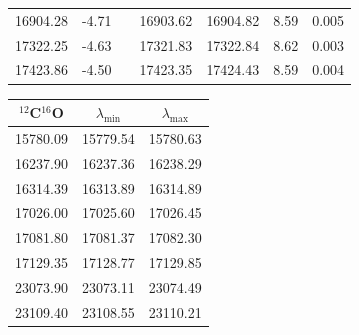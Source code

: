 \begin{table}[h!]
\begin{center}
\begin{tabular}{ccccccc}
16904.28 & -4.71& & 16903.62&16904.82& 8.59&0.005\\
17322.25 & -4.63& & 17321.83&17322.84& 8.62&0.003\\
17423.86 & -4.50& & 17423.35&17424.43& 8.59&0.004\\
        \hline
        \end{tabular} \par
        \vspace{1cm}
        \begin{tabular}{ccc}
          \hline
          \hline
          $^{12}$C$^{16}$O & $\lambda_{\mathrm{min}}$ & $\lambda_{\mathrm{max}}$ \\
          \hline
          15780.09 & 15779.54 & 15780.63 \\
          16237.90 & 16237.36 & 16238.29 \\
          16314.39 & 16313.89 & 16314.89 \\
          17026.00 & 17025.60 & 17026.45 \\
          17081.80 & 17081.37 & 17082.30 \\
          17129.35 & 17128.77 & 17129.85 \\
          23073.90 & 23073.11 & 23074.49 \\
          23109.40 & 23108.55 & 23110.21 \\
          \hline
          \end{tabular}
    \end{center} 
    \hspace{2.0cm}
 

\end{table}
